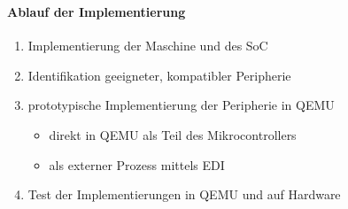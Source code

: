 \begin{frame}[fragile]
\frametitle{\insertsection}
\framesubtitle{Ablauf der Implementierung}

\begin{enumerate}
    \item Implementierung der Maschine und des SoC
    \item Identifikation geeigneter, kompatibler Peripherie
    \item prototypische Implementierung der Peripherie in QEMU
    \begin{itemize}
        \item direkt in QEMU als Teil des Mikrocontrollers
        \item als externer Prozess mittels EDI
    \end{itemize}
    \item Test der Implementierungen in QEMU und auf Hardware
\end{enumerate}

\end{frame}
